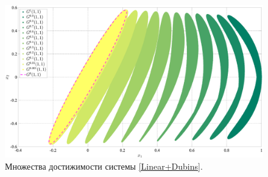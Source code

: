 \documentclass[../main.tex]{subfiles}
\begin{document}
\begin{figure}[ht]
	\centerline{
		\includegraphics[width=\textwidth]{images/Osipov_QuaziDubins.eps}}
	\caption{Множества достижимости системы \eqref{Linear+Dubins}.}
	\label{fig:LinearDubins}
\end{figure}
\end{document}
